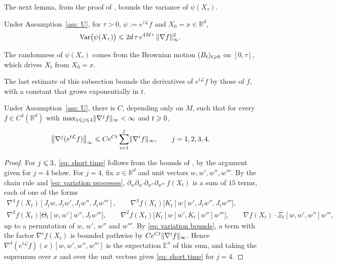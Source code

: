 The next lemma, from the proof of \citep[Lemma~8]{ye2026mse}, bounds the variance of $\psi(X_\tau)$.

\begin{lemma}
\label{lem: variance bound}
    Under Assumption~\ref{ass: U}, for $\tau > 0$, $\psi := e^{\tau\mathcal L} f$ and $X_0 = x \in \mathbb R^d$,
    \begin{equation}
        \mathrm{Var}\bigl( \psi(X_\tau) \bigr) \leqslant 2 d\, \tau\, e^{4M\tau}\, \lVert \nabla f \rVert_\infty^2 .
        \label{eq: variance bound}
    \end{equation}
\end{lemma}
The randomness of $\psi(X_\tau)$ comes from the Brownian motion $(B_t)_{t \geqslant 0}$ on $[0,\tau]$, which drives $X_t$ from $X_0 = x$.

The last estimate of this subsection bounds the derivatives of $e^{t\mathcal L} f$ by those of $f$, with a constant that grows exponentially in $t$.

\begin{lemma}
\label{lem: short time}
    Under Assumption~\ref{ass: U}, there is $C$, depending only on $M$, such that for every $f \in C^4(\mathbb R^d)$ with $\max_{1 \leqslant j \leqslant 4} \lVert \nabla^j f \rVert_\infty < \infty$ and $t \geqslant 0$,
    \begin{equation}
        \bigl\| \nabla^j (e^{t\mathcal L} f) \bigr\|_\infty \leqslant C e^{C t} \sum_{i=1}^{j} \lVert \nabla^i f \rVert_\infty , \qquad j = 1,2,3,4 .
        \label{eq: short time}
    \end{equation}
\end{lemma}

\begin{proof}
    For $j \leqslant 3$, \eqref{eq: short time} follows from the bounds of \citep[Lemma~6]{ye2026mse}, by the argument given for $j = 4$ below. For $j = 4$, fix $x \in \mathbb R^d$ and unit vectors $w, w', w'', w'''$. By the chain rule and \eqref{eq: variation processes}, $\partial_w \partial_{w'} \partial_{w''} \partial_{w'''}\, f(X_t)$ is a sum of $15$ terms, each of one of the forms
    \begin{equation*}
    \begin{gathered}
        \nabla^4 f(X_t)[J_t w, J_t w', J_t w'', J_t w'''] , \qquad
        \nabla^3 f(X_t)\bigl[ K_t[w] w', J_t w'', J_t w''' \bigr] , \\
        \nabla^2 f(X_t)\bigl[ \Theta_t[w,w'] w'', J_t w''' \bigr] , \qquad
        \nabla^2 f(X_t)\bigl[ K_t[w] w', K_t[w''] w''' \bigr] , \qquad
        \nabla f(X_t) \cdot \Xi_t[w,w',w''] w''' ,
    \end{gathered}
    \end{equation*}
    up to a permutation of $w$, $w'$, $w''$ and $w'''$. By \eqref{eq: variation bounds}, a term with the factor $\nabla^i f(X_t)$ is bounded pathwise by $C e^{Ct} \lVert \nabla^i f \rVert_\infty$. Hence $\nabla^4 (e^{t\mathcal L} f)(x)[w,w',w'',w''']$ is the expectation $\mathbb E^x$ of this sum, and taking the supremum over $x$ and over the unit vectors gives \eqref{eq: short time} for $j = 4$.
\end{proof}

